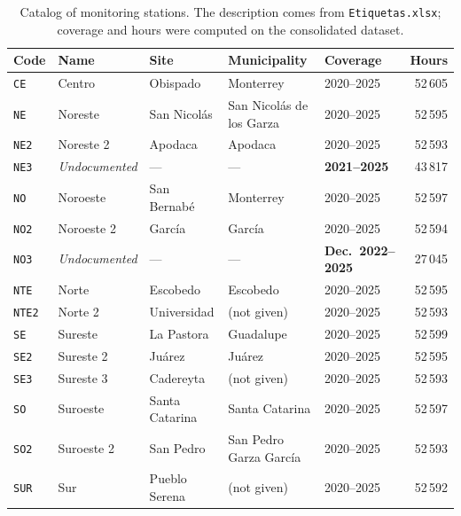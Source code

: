 \begin{table}[pos=t]
  \centering
  \caption{Catalog of monitoring stations. The description comes from
    \texttt{Etiquetas.xlsx}; coverage and hours were computed on the
    consolidated dataset.}
  \label{tab:dic-estaciones}
  \small
  \begin{tabular}{lllllr}
    \toprule
    Code & Name & Site & Municipality & Coverage & Hours \\
    \midrule
    \texttt{CE}   & Centro                & Obispado       & Monterrey                & 2020--2025                & 52\,605 \\
    \texttt{NE}   & Noreste               & San Nicolás    & San Nicolás de los Garza & 2020--2025                & 52\,595 \\
    \texttt{NE2}  & Noreste 2             & Apodaca        & Apodaca                  & 2020--2025                & 52\,593 \\
    \texttt{NE3}  & \emph{Undocumented}   & ---            & ---                      & \textbf{2021--2025}       & 43\,817 \\
    \texttt{NO}   & Noroeste              & San Bernabé    & Monterrey                & 2020--2025                & 52\,597 \\
    \texttt{NO2}  & Noroeste 2            & García         & García                   & 2020--2025                & 52\,594 \\
    \texttt{NO3}  & \emph{Undocumented}   & ---            & ---                      & \textbf{Dec.\ 2022--2025} & 27\,045 \\
    \texttt{NTE}  & Norte                 & Escobedo       & Escobedo                 & 2020--2025                & 52\,595 \\
    \texttt{NTE2} & Norte 2               & Universidad    & (not given)              & 2020--2025                & 52\,593 \\
    \texttt{SE}   & Sureste               & La Pastora     & Guadalupe                & 2020--2025                & 52\,599 \\
    \texttt{SE2}  & Sureste 2             & Juárez         & Juárez                   & 2020--2025                & 52\,595 \\
    \texttt{SE3}  & Sureste 3             & Cadereyta      & (not given)              & 2020--2025                & 52\,593 \\
    \texttt{SO}   & Suroeste              & Santa Catarina & Santa Catarina           & 2020--2025                & 52\,597 \\
    \texttt{SO2}  & Suroeste 2            & San Pedro      & San Pedro Garza García   & 2020--2025                & 52\,593 \\
    \texttt{SUR}  & Sur                   & Pueblo Serena  & (not given)              & 2020--2025                & 52\,592 \\
    \bottomrule
  \end{tabular}
\end{table}


